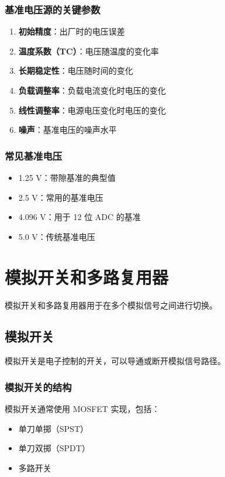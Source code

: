 \subsubsection{基准电压源的关键参数}

\begin{enumerate}
  \item \textbf{初始精度}：出厂时的电压误差
  \item \textbf{温度系数（TC）}：电压随温度的变化率
  \item \textbf{长期稳定性}：电压随时间的变化
  \item \textbf{负载调整率}：负载电流变化时电压的变化
  \item \textbf{线性调整率}：电源电压变化时电压的变化
  \item \textbf{噪声}：基准电压的噪声水平
\end{enumerate}

\subsubsection{常见基准电压}

\begin{itemize}
  \item 1.25 V：带隙基准的典型值
  \item 2.5 V：常用的基准电压
  \item 4.096 V：用于 12 位 ADC 的基准
  \item 5.0 V：传统基准电压
\end{itemize}

\section{模拟开关和多路复用器}

模拟开关和多路复用器用于在多个模拟信号之间进行切换。

\subsection{模拟开关}

模拟开关是电子控制的开关，可以导通或断开模拟信号路径。

\subsubsection{模拟开关的结构}

模拟开关通常使用 MOSFET 实现，包括：
\begin{itemize}
  \item 单刀单掷（SPST）
  \item 单刀双掷（SPDT）
  \item 多路开关
\end{itemize}

